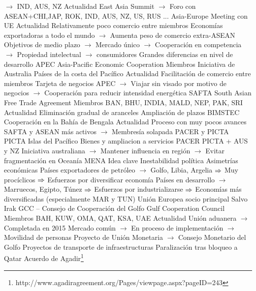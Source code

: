 \documentclass{nuevotema}
\begin{document}
\begin{esquemal}
				\4[] $\to$ IND, AUS, NZ
				\4 Actualidad
				\4[] East Asia Summit
				\4[] $\to$ Foro con ASEAN+CHI,JAP, ROK, IND, AUS, NZ, US, RUS ...
				\4[] Asia-Europe Meeting con UE
				\4 Actualidad
				\4[] Relativamente poco comercio entre miembros
				\4[] Economías exportadoras a todo el mundo
				\4[] $\to$ Aumenta peso de comercio extra-ASEAN
				\4[] Objetivos de medio plazo
				\4[] $\to$ Mercado único
				\4[] $\to$ Cooperación en competencia
				\4[] $\to$ Propiedad intelectual
				\4[] $\to$ consumidores
				\4[] Grandes diferencias en nivel de desarrollo
			\3 APEC
				\4 Asia-Pacific Economic Cooperation
				\4 Miembros
				\4[] Iniciativa de Australia
				\4[] Países de la costa del Pacífico
				\4 Actualidad
				\4[] Facilitación de comercio entre miembros
				\4[] Tarjeta de negocios APEC
				\4[] $\to$ Viajar sin visado por motivo de negocios
				\4[] $\to$ Cooperación para reducir intensidad energética
			\3 SAFTA
				\4 South Asian Free Trade Agreement
				\4 Miembros
				\4[] BAN, BHU, INDIA, MALD, NEP, PAK, SRI
				\4 Actualidad
				\4[] Eliminación gradual de aranceles
				\4[] Ampliación de plazos
			\3 BIMSTEC
				\4 Cooperación en la Bahía de Bengala
				\4 Actualidad
				\4[] Proceso con muy pocos avances
				\4[] SAFTA y ASEAN más activos
				\4[] $\to$ Membresía solapada
			\3 PACER y PICTA
				\4 PICTA
				\4[] Islas del Pacífico
				\4[] Bienes y ampliacion a servicios
				\4 PACER
				\4[] PICTA + AUS y NZ
				\4[] Iniciativa australiana
				\4[] $\to$ Mantener influencia en región
				\4[] $\to$ Evitar fragmentación en Oceanía
		\2 MENA
			\3 Idea clave
				\4 Inestabilidad política
				\4 Asimetrías económicas
				\4[] Países exportadores de petróleo
				\4[] $\to$ Golfo, Libia, Argelia
				\4[] $\Rightarrow$ Muy procíclicos
				\4[] $\Rightarrow$ Esfuerzos por diversificar economía
				\4[] Países en desarrollo
				\4[] $\to$ Marruecos, Egipto, Túnez
				\4[] $\Rightarrow$ Esfuerzos por industrializarse
				\4[] $\Rightarrow$ Economías más diversificadas (especialmente MAR y TUN)
				\4 Unión Europea socio principal
				\4[] Salvo Irak
			\3 GCC -- Consejo de Cooperación del Golfo
				\4 Gulf Cooperation Council
				\4 Miembros
				\4[] BAH, KUW, OMA, QAT, KSA, UAE
				\4 Actualidad
				\4[] Unión aduanera
				\4[] $\to$ Completada en 2015
				\4[] Mercado común
				\4[] $\to$ En proceso de implementación
				\4[] $\to$ Movilidad de personas
				\4[] Proyecto de Unión Monetaria
				\4[] $\to$ Consejo Monetario del Golfo
				\4[] Proyectos de transporte de infraestructuras
				\4[] Paralización tras bloqueo a Qatar
			\3 Acuerdo de Agadir\footnote{http://www.agadiragreement.org/Pages/viewpage.aspx?pageID=243}

\end{esquemal}
\end{document}
